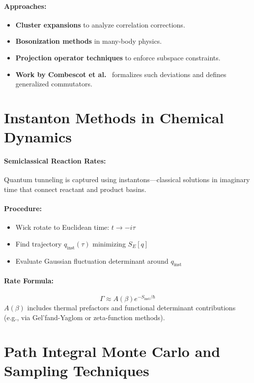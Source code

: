 \paragraph{Approaches:}
\begin{itemize}
  \item \textbf{Cluster expansions} to analyze correlation corrections.
  \item \textbf{Bosonization methods} in many-body physics.
  \item \textbf{Projection operator techniques} to enforce subspace constraints.
  \item \textbf{Work by Combescot et al.}~\cite{Combescot2008} formalizes such deviations and defines generalized commutators.
\end{itemize}

\section{Instanton Methods in Chemical Dynamics}
\label{app:instantons}

\paragraph{Semiclassical Reaction Rates:} Quantum tunneling is captured using instantons—classical solutions in imaginary time that connect reactant and product basins.

\paragraph{Procedure:}
\begin{itemize}
  \item Wick rotate to Euclidean time: \( t \to -i\tau \)
  \item Find trajectory \( q_{\text{inst}}(\tau) \) minimizing \( S_E[q] \)
  \item Evaluate Gaussian fluctuation determinant around \( q_{\text{inst}} \)
\end{itemize}

\paragraph{Rate Formula:}
\[ \Gamma \approx A(\beta) e^{-S_{\text{inst}}/\hbar} \]
\(A(\beta)\) includes thermal prefactors and functional determinant contributions (e.g., via Gel'fand-Yaglom or zeta-function methods).

\section{Path Integral Monte Carlo and Sampling Techniques}
\label{app:pimc}

